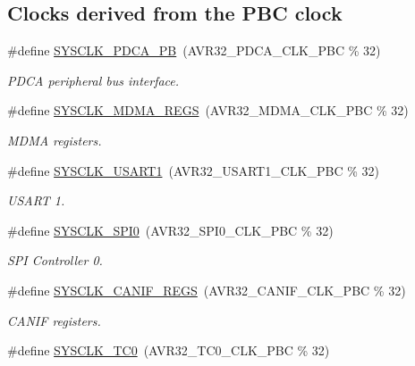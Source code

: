 \subsection*{\-Clocks derived from the \-P\-B\-C clock}
\begin{DoxyCompactItemize}
\item 
\#define \hyperlink{group__sysclk__group_gac83d44e5be54c7b52b86deb4fc338516}{\-S\-Y\-S\-C\-L\-K\-\_\-\-P\-D\-C\-A\-\_\-\-P\-B}~(\-A\-V\-R32\-\_\-\-P\-D\-C\-A\-\_\-\-C\-L\-K\-\_\-\-P\-B\-C \% 32)
\begin{DoxyCompactList}\small\item\em \-P\-D\-C\-A peripheral bus interface. \end{DoxyCompactList}\item 
\#define \hyperlink{group__sysclk__group_gabe01b7586526964dd55bc275e9d40f39}{\-S\-Y\-S\-C\-L\-K\-\_\-\-M\-D\-M\-A\-\_\-\-R\-E\-G\-S}~(\-A\-V\-R32\-\_\-\-M\-D\-M\-A\-\_\-\-C\-L\-K\-\_\-\-P\-B\-C \% 32)
\begin{DoxyCompactList}\small\item\em \-M\-D\-M\-A registers. \end{DoxyCompactList}\item 
\#define \hyperlink{group__sysclk__group_ga1acb0cc02d975a6d9d4e92e56a2438a0}{\-S\-Y\-S\-C\-L\-K\-\_\-\-U\-S\-A\-R\-T1}~(\-A\-V\-R32\-\_\-\-U\-S\-A\-R\-T1\-\_\-\-C\-L\-K\-\_\-\-P\-B\-C \% 32)
\begin{DoxyCompactList}\small\item\em \-U\-S\-A\-R\-T 1. \end{DoxyCompactList}\item 
\#define \hyperlink{group__sysclk__group_ga77679d8f496ed32ec8c2476fc28ecf45}{\-S\-Y\-S\-C\-L\-K\-\_\-\-S\-P\-I0}~(\-A\-V\-R32\-\_\-\-S\-P\-I0\-\_\-\-C\-L\-K\-\_\-\-P\-B\-C \% 32)
\begin{DoxyCompactList}\small\item\em \-S\-P\-I \-Controller 0. \end{DoxyCompactList}\item 
\#define \hyperlink{group__sysclk__group_gadf592c60fdfb5213d813f9b5c753f0f7}{\-S\-Y\-S\-C\-L\-K\-\_\-\-C\-A\-N\-I\-F\-\_\-\-R\-E\-G\-S}~(\-A\-V\-R32\-\_\-\-C\-A\-N\-I\-F\-\_\-\-C\-L\-K\-\_\-\-P\-B\-C \% 32)
\begin{DoxyCompactList}\small\item\em \-C\-A\-N\-I\-F registers. \end{DoxyCompactList}\item 
\#define \hyperlink{group__sysclk__group_gabe7aa477c7c5b3887df1d762a750b04a}{\-S\-Y\-S\-C\-L\-K\-\_\-\-T\-C0}~(\-A\-V\-R32\-\_\-\-T\-C0\-\_\-\-C\-L\-K\-\_\-\-P\-B\-C \% 32)

\end{DoxyCompactItemize}
